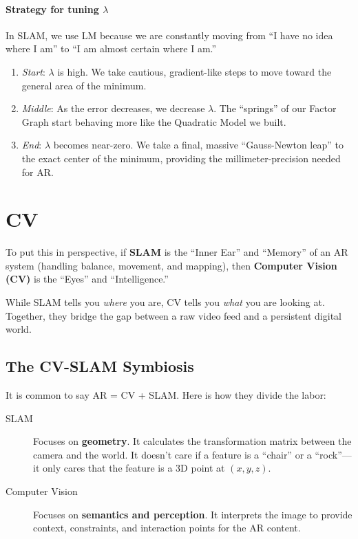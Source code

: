 \documentclass[11pt]{article}
\begin{document}
\paragraph*{Strategy for tuning \(\lambda\)}
\label{sec:org077ff8d}
In SLAM, we use LM because we are constantly moving
from ``I have no idea where I am'' to ``I am almost
certain where I am.''

\begin{enumerate}
\item \emph{Start}: \(\lambda\) is high. We take cautious,
gradient-like steps to move toward the general area
of the minimum.
\item \emph{Middle}: As the error decreases, we decrease
\(\lambda\). The ``springs'' of our Factor Graph start
behaving more like the Quadratic Model we built.
\item \emph{End}: \(\lambda\) becomes near-zero. We take a final,
massive ``Gauss-Newton leap'' to the exact center of
the minimum, providing the millimeter-precision
needed for AR.
\end{enumerate}
\section{CV}
\label{sec:org267bc1b}
To put this in perspective, if \textbf{SLAM} is the ``Inner
Ear'' and ``Memory'' of an AR system (handling balance,
movement, and mapping), then \textbf{Computer Vision (CV)} is
the ``Eyes'' and ``Intelligence.''

While SLAM tells you \emph{where} you are, CV tells you
\emph{what} you are looking at.  Together, they bridge the
gap between a raw video feed and a persistent digital
world.
\subsection{The CV-SLAM Symbiosis}
\label{sec:org39c0523}
It is common to say AR = CV + SLAM. Here is how they divide the labor:

\begin{description}
\item[{SLAM}] Focuses on \textbf{geometry}. It calculates the
transformation matrix between the camera and the
world.  It doesn't care if a feature is a ``chair'' or
a ``rock''---it only cares that the feature is a 3D point
at \((x, y, z)\).
\item[{Computer Vision}] Focuses on \textbf{semantics and
perception}.  It interprets the image to provide
context, constraints, and interaction points for the
AR content.
\end{description}
\end{document}
